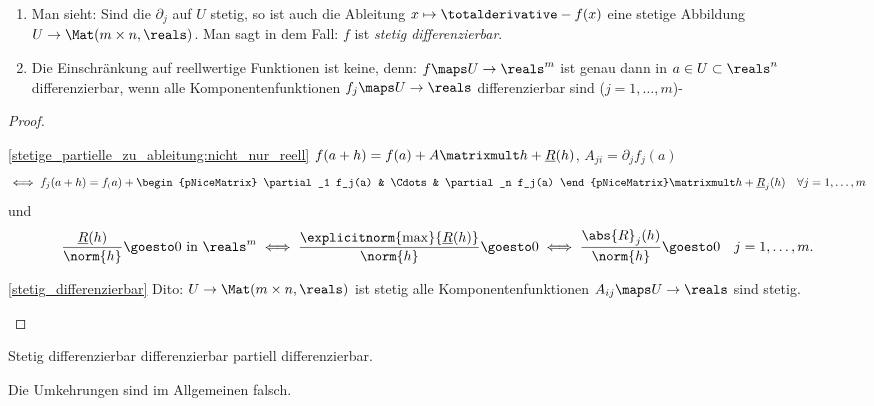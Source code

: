 \begin{bemerkungen}
    \begin{enumerate}
        \item \label{stetig_differenzierbar} Man sieht: Sind die \( \partial_j  \) auf \( U \) stetig, so ist auch die Ableitung \( x\mapsto \totalderivative-{f}(x) \) eine stetige Abbildung \( U\to \Mat(m\times n, \reals) \). Man sagt in dem Fall: \( f \) ist \emph{stetig differenzierbar}.
        \item \label{stetige_partielle_zu_ableitung:nicht_nur_reell} Die Einschränkung auf reellwertige Funktionen ist keine, denn: \( f\maps U\to \reals^m \) ist genau dann in \( a\in U\subset \reals^n \) differenzierbar, wenn alle Komponentenfunktionen \( f_j\maps U\to \reals \) differenzierbar sind (\( j=1,\dotsc, m \))-
    \end{enumerate}
\end{bemerkungen}
\begin{proof}
    \begin{proofdescription}
        \item[\ref{stetige_partielle_zu_ableitung:nicht_nur_reell}] \( f(a+h)=f(a)+A\matrixmult h+\underline{R}(h) \), \( A_{ji}=\partial_j f_j(a) \) 
        \begin{equation*}
            \iff f_j(a+h)=f_(a)+\begin{pNiceMatrix} \partial_1 f_j(a) & \Cdots & \partial_n f_j(a) \end{pNiceMatrix}\matrixmult h+\underline{R}_j(h)\quad \forall j=1,\dotsc, m
        \end{equation*}
        und
        \begin{equation*}
            \frac{\underline{R}(h)}{\norm{h}}\goesto 0 \text{ in }\reals^m\iff \frac{\explicitnorm{\max}{\underline{R}(h)}}{\norm{h}}\goesto 0\iff \frac{\abs{R}_j(h)}{\norm{h}}\goesto 0\quad j=1,\dotsc,m.
        \end{equation*}
        \item[\ref{stetig_differenzierbar}] Dito: \( U\to \Mat(m\times n,\reals) \) ist stetig \tiff alle Komponentenfunktionen \( A_{ij}\maps U\to \reals \) sind stetig.
    \end{proofdescription}
    
\end{proof}
\begin{bemerkung*}
    Stetig differenzierbar \timplies differenzierbar \timplies partiell differenzierbar.

    Die Umkehrungen sind im Allgemeinen falsch.
\end{bemerkung*}
